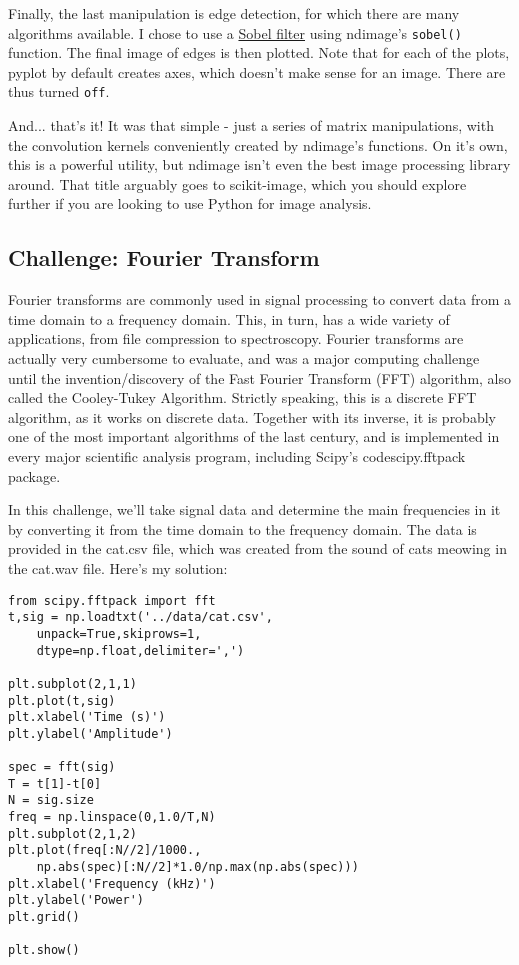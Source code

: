 \documentclass[12pt]{article}
\newcommand{\code}{\texttt}
\begin{document}
Finally, the last manipulation is edge detection, for which there are many algorithms available. I chose to use a \href{https://en.wikipedia.org/wiki/Sobel_operator}{Sobel filter} using ndimage's \code{sobel()} function. The final image of edges is then plotted. Note that for each of the plots, pyplot by default creates axes, which doesn't make sense for an image. There are thus turned \code{off}.

And... that's it! It was that simple - just a series of matrix manipulations, with the convolution kernels conveniently created by ndimage's functions. On it's own, this is a powerful utility, but ndimage isn't even the best image processing library around. That title arguably goes to scikit-image, which you should explore further if you are looking to use Python for image analysis. 

\subsection{Challenge: Fourier Transform}
Fourier transforms are commonly used in signal processing to convert data from a time domain to a frequency domain. This, in turn, has a wide variety of applications, from file compression to spectroscopy. Fourier transforms are actually very cumbersome to evaluate, and was a major computing challenge until the invention/discovery of the Fast Fourier Transform (FFT) algorithm, also called the Cooley-Tukey Algorithm. Strictly speaking, this is a discrete FFT algorithm, as it works on discrete data. Together with its inverse, it is probably one of the most important algorithms of the last century, and is implemented in every major scientific analysis program, including Scipy's code{scipy.fftpack} package. 

In this challenge, we'll take signal data and determine the main frequencies in it by converting it from the time domain to the frequency domain. The data is provided in the cat.csv file, which was created from the sound of cats meowing in the cat.wav file. Here's my solution:

\begin{lstlisting}[frame=single] 
from scipy.fftpack import fft
t,sig = np.loadtxt('../data/cat.csv', 
	unpack=True,skiprows=1,
	dtype=np.float,delimiter=',')

plt.subplot(2,1,1)
plt.plot(t,sig)
plt.xlabel('Time (s)')
plt.ylabel('Amplitude')

spec = fft(sig)
T = t[1]-t[0]
N = sig.size
freq = np.linspace(0,1.0/T,N)
plt.subplot(2,1,2)
plt.plot(freq[:N//2]/1000.,
	np.abs(spec)[:N//2]*1.0/np.max(np.abs(spec)))
plt.xlabel('Frequency (kHz)')
plt.ylabel('Power')
plt.grid()

plt.show()
\end{lstlisting}
\end{document}
